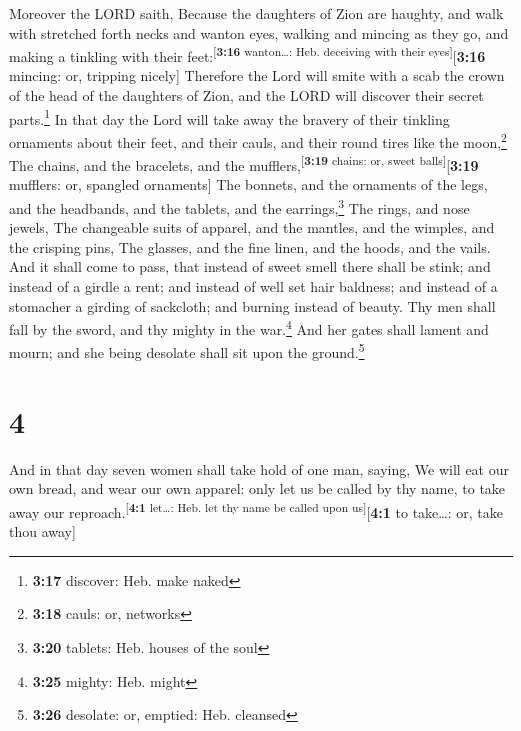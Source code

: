  Moreover the LORD saith, Because the daughters of Zion
are haughty, and walk with stretched forth necks and wanton eyes,
walking and mincing as they go, and making a tinkling with their
feet:\textsuperscript{{[}\textbf{3:16} wanton\ldots: Heb. deceiving with
their eyes{]}}{[}\textbf{3:16} mincing: or, tripping nicely{]}
 Therefore the Lord will smite with a scab the crown of
the head of the daughters of Zion, and the LORD will discover their
secret parts.\footnote{\textbf{3:17} discover: Heb. make naked}
 In that day the Lord will take away the bravery of their
tinkling ornaments about their feet, and their cauls, and their round
tires like the moon,\footnote{\textbf{3:18} cauls: or, networks}
 The chains, and the bracelets, and the
mufflers,\textsuperscript{{[}\textbf{3:19} chains: or, sweet
balls{]}}{[}\textbf{3:19} mufflers: or, spangled ornaments{]}
 The bonnets, and the ornaments of the legs, and the
headbands, and the tablets, and the earrings,\footnote{\textbf{3:20}
  tablets: Heb. houses of the soul}  The rings, and nose
jewels,  The changeable suits of apparel, and the
mantles, and the wimples, and the crisping pins,  The
glasses, and the fine linen, and the hoods, and the vails.
 And it shall come to pass, that instead of sweet smell
there shall be stink; and instead of a girdle a rent; and instead of
well set hair baldness; and instead of a stomacher a girding of
sackcloth; and burning instead of beauty.  Thy men shall
fall by the sword, and thy mighty in the war.\footnote{\textbf{3:25}
  mighty: Heb. might}  And her gates shall lament and
mourn; and she being desolate shall sit upon the ground.\footnote{\textbf{3:26}
  desolate: or, emptied: Heb. cleansed}

\hypertarget{section-3}{%
\section{4}\label{section-3}}

 And in that day seven women shall take hold of one man,
saying, We will eat our own bread, and wear our own apparel: only let us
be called by thy name, to take away our
reproach.\textsuperscript{{[}\textbf{4:1} let\ldots: Heb. let thy name
be called upon us{]}}{[}\textbf{4:1} to take\ldots: or, take thou
away{]}

